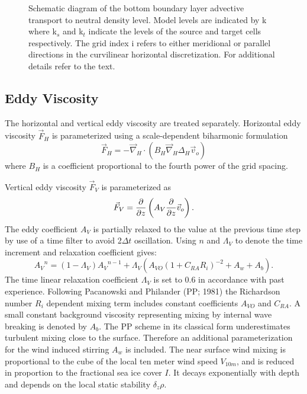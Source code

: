\begin{figure}[!tb]%
\centerline{\hbox{}}
\caption{Schematic diagram of the bottom boundary layer advective transport to neutral density level.
Model levels are indicated by k where
k$_s$ and k$_t$ indicate the levels of the source and target cells respectively.
The grid index i refers to either meridional or parallel directions in the curvilinear 
horizontal discretization.
For additional details refer to the text.
}
\label{fig:bbl}
\end{figure}

\subsection{Eddy Viscosity}


The horizontal and vertical eddy viscosity are treated separately.
Horizontal eddy viscosity ${\vec F}_H$ is parameterized 
using a scale-dependent biharmonic formulation
\begin{equation}
\label{eqn:momvisc}
{\vec F}_H =
- {\vec \nabla_{H}} \cdot \left( B_H {\vec\nabla_H} \Delta_H {\vec v_o} \right)
\end{equation}
where $B_H$ is a coefficient proportional to the fourth power
of the grid spacing.
 
Vertical eddy viscosity ${\vec F}_V$ is parameterized as
\begin{equation}
\label{eqn:vedd}
{\vec F}_V =
{\partial \over {\partial z}}
\left(A_V{\partial \over {\partial z}}{\vec v}_o \right).
\end{equation}
The eddy coefficient $A_V$ is partially relaxed to the value at the previous time step
by use of a time filter to avoid 2$\Delta t$ oscillation.
Using $n$ and $\Lambda_V$ to denote the time increment and relaxation coefficient gives:
\begin{equation}
\label{eqn:vedd2}
{A_V}^n =
\left(1 - \Lambda_V\right){A_V}^{n-1} + \Lambda_V\left(A_{\mathit{VO}}\left(1 + C_{\mathit{RA}}R_i\right)^{-2}
+ A_w + A_b\right).
\end{equation}
The time linear relaxation coefficient $\Lambda_V$ is set to 0.6
in accordance with past experience.
Following Pacanowski and Philander (PP; 1981)\nocite{pacanowski81}
the Richardson number $R_i$ dependent mixing term includes constant coefficients $A_{\mathit{VO}}$ and $C_{\mathit{RA}}$. A small constant background viscosity representing mixing by internal wave breaking is denoted by $A_b$.
The PP scheme in its classical form underestimates turbulent mixing close to the surface. Therefore an additional parameterization for the wind induced stirring $A_w$ is included.  
The near surface wind mixing is proportional to the cube of the local ten meter wind speed $V_{10m}$,
and is reduced in proportion to the fractional sea ice cover $I$.
It decays exponentially with depth and depends on the local static stability $\delta_z \rho$.

